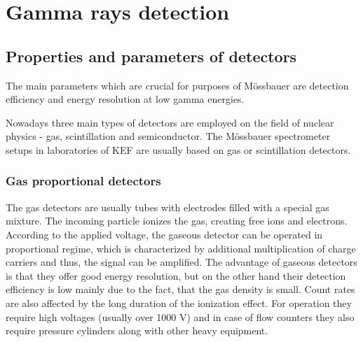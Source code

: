 
\chapter{Gamma rays detection}


\section{Properties and parameters of detectors}
The main parameters which are crucial for purposes of Mössbauer are detection efficiency and energy resolution at low gamma energies.
\par
Nowadays three main types of detectors are employed on the field of nuclear physics - gas, scintillation and semiconductor.
The Mössbauer spectrometer setups in laboratories of KEF are usually based on gas or scintillation detectors.


\subsection{Gas proportional detectors}
The gas detectors are usually tubes with electrodes filled with a special gas mixture. The incoming particle ionizes the gas, creating free ions and electrons.  According to the applied voltage, the gaseous detector can be operated in proportional regime, which is characterized by additional multiplication of charge carriers and thus, the signal can be amplified. The advantage of gaseous detectors is that they offer good energy resolution, but on the other hand their detection efficiency is low mainly due to the fact, that the gas density is small. Count rates are also affected by the long duration of the ionization effect. For operation they require high voltages (usually over 1000 V) and in case of flow counters they also require pressure cylinders along with other heavy equipment. 

